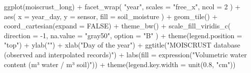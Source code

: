 \documentclass[
  table]{article}
\newenvironment{Shaded}{\begin{snugshade}}{\end{snugshade}}
\newcommand{\AttributeTok}[1]{\textcolor[rgb]{0.77,0.63,0.00}{#1}}
\newcommand{\ConstantTok}[1]{\textcolor[rgb]{0.00,0.00,0.00}{#1}}
\newcommand{\DecValTok}[1]{\textcolor[rgb]{0.00,0.00,0.81}{#1}}
\newcommand{\FloatTok}[1]{\textcolor[rgb]{0.00,0.00,0.81}{#1}}
\newcommand{\FunctionTok}[1]{\textcolor[rgb]{0.00,0.00,0.00}{#1}}
\newcommand{\NormalTok}[1]{#1}
\newcommand{\SpecialCharTok}[1]{\textcolor[rgb]{0.00,0.00,0.00}{#1}}
\newcommand{\StringTok}[1]{\textcolor[rgb]{0.31,0.60,0.02}{#1}}
\begin{document}
\begin{Shaded}
\begin{Highlighting}[]
\FunctionTok{ggplot}\NormalTok{(moiscrust\_long) }\SpecialCharTok{+} 
  \FunctionTok{facet\_wrap}\NormalTok{(}
    \StringTok{"year"}\NormalTok{, }
    \AttributeTok{scales =} \StringTok{"free\_x"}\NormalTok{, }
    \AttributeTok{ncol =} \DecValTok{2}
\NormalTok{    ) }\SpecialCharTok{+}
  \FunctionTok{aes}\NormalTok{(}
    \AttributeTok{x =}\NormalTok{ year\_day, }
    \AttributeTok{y =}\NormalTok{ sensor, }
    \AttributeTok{fill =}\NormalTok{ soil\_moisture}
\NormalTok{    ) }\SpecialCharTok{+} 
  \FunctionTok{geom\_tile}\NormalTok{() }\SpecialCharTok{+} 
  \FunctionTok{coord\_cartesian}\NormalTok{(}\AttributeTok{expand =} \ConstantTok{FALSE}\NormalTok{) }\SpecialCharTok{+}
  \FunctionTok{theme\_bw}\NormalTok{() }\SpecialCharTok{+} 
  \FunctionTok{scale\_fill\_viridis\_c}\NormalTok{(}
    \AttributeTok{direction =} \SpecialCharTok{{-}}\DecValTok{1}\NormalTok{, }
    \AttributeTok{na.value =} \StringTok{"gray50"}\NormalTok{, }
    \AttributeTok{option =} \StringTok{"B"}
\NormalTok{    ) }\SpecialCharTok{+}
  \FunctionTok{theme}\NormalTok{(}\AttributeTok{legend.position =} \StringTok{"top"}\NormalTok{) }\SpecialCharTok{+} 
  \FunctionTok{ylab}\NormalTok{(}\StringTok{""}\NormalTok{) }\SpecialCharTok{+} 
  \FunctionTok{xlab}\NormalTok{(}\StringTok{"Day of the year"}\NormalTok{) }\SpecialCharTok{+}
  \FunctionTok{ggtitle}\NormalTok{(}\StringTok{"MOISCRUST database (observed and interpolated records)"}\NormalTok{) }\SpecialCharTok{+}
  \FunctionTok{labs}\NormalTok{(}\AttributeTok{fill =} \FunctionTok{expression}\NormalTok{(}\StringTok{"Volumetric water content (m³ water / m³ soil)"}\NormalTok{)) }\SpecialCharTok{+} 
  \FunctionTok{theme}\NormalTok{(}\AttributeTok{legend.key.width =} \FunctionTok{unit}\NormalTok{(}\FloatTok{0.8}\NormalTok{, }\StringTok{"cm"}\NormalTok{))}
\end{Highlighting}
\end{Shaded}
\end{document}
